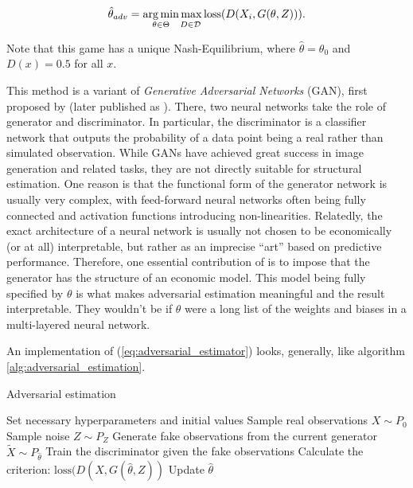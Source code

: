 \begin{equation}
    \label{eq:adversarial_estimator}
        \hat{\theta}_{adv} = \underset{\theta \in \Theta}{\arg\min}\underset{D\in\mathcal{D}}{\vphantom{g}\max} \operatorname{loss}(D(X_i, G(\theta, Z))).
\end{equation}

Note that this game has a unique Nash-Equilibrium, where $\hat{\theta} = \theta_0$ and $D(x) = 0.5$ for all $x$.

This method is a variant of \textit{Generative Adversarial Networks} (GAN), first proposed by \textcite{goodfellow2014generative} (later published as \textcite{goodfellow2020generative}).
There, two neural networks take the role of generator and discriminator. %
In particular, the discriminator is a classifier network that outputs the probability of a data point being a real rather than simulated observation.
While GANs have achieved great success in image generation and related tasks, %
they are not directly suitable for structural estimation.
One reason is that the functional form of the generator network is usually very complex, with feed-forward neural networks often being fully connected and activation functions introducing non-linearities.
Relatedly, the exact architecture of a neural network is usually not chosen to be economically (or at all) interpretable, but rather as an imprecise ``art'' based on predictive performance.
Therefore, one essential contribution of \textcite{kaji2023adversarial} is to impose that the generator has the structure of an economic model.
This model being fully specified by $\theta$ is what makes adversarial estimation meaningful and the result interpretable.
They wouldn't be if $\theta$ were a long list of the weights and biases in a multi-layered neural network.

An implementation of (\ref{eq:adversarial_estimator}) looks, generally, like algorithm \ref{alg:adversarial_estimation}.

\begin{algorithm}
    \caption{Adversarial estimation}
    \label{alg:adversarial_estimation}
    \begin{algorithmic}[1]
        \STATE Set necessary hyperparameters and initial values
        \STATE Sample real observations $X \sim P_0$
        \STATE Sample noise $Z \sim P_Z$
            \STATE Generate fake observations from the current generator $\widetilde{X} \sim P_{\hat{\theta}}$ 
                \STATE Train the discriminator given the fake observations
            \ENDIF
            \STATE Calculate the criterion: $\text{loss}(D(X, G(\hat{\theta}, Z))$
            \STATE Update $\hat{\theta}$ %
        \ENDWHILE
    \end{algorithmic}
\end{algorithm}


